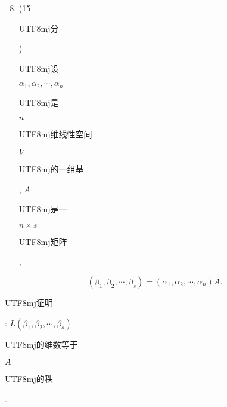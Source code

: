 \documentclass[10pt]{article}
\begin{document}
\begin{enumerate}
  \setcounter{enumi}{7}
  \item (15 \begin{CJK}{UTF8}{mj}分\end{CJK}) \begin{CJK}{UTF8}{mj}设\end{CJK} $\alpha_{1}, \alpha_{2}, \cdots, \alpha_{n}$ \begin{CJK}{UTF8}{mj}是\end{CJK} $n$ \begin{CJK}{UTF8}{mj}维线性空间\end{CJK} $V$ \begin{CJK}{UTF8}{mj}的一组基\end{CJK}, $A$ \begin{CJK}{UTF8}{mj}是一\end{CJK} $n \times s$ \begin{CJK}{UTF8}{mj}矩阵\end{CJK},
\end{enumerate}
$$
\left(\beta_{1}, \beta_{2}, \cdots, \beta_{s}\right)=\left(\alpha_{1}, \alpha_{2}, \cdots, \alpha_{n}\right) A .
$$
\begin{CJK}{UTF8}{mj}证明\end{CJK}: $L\left(\beta_{1}, \beta_{2}, \cdots, \beta_{s}\right)$ \begin{CJK}{UTF8}{mj}的维数等于\end{CJK} $A$ \begin{CJK}{UTF8}{mj}的秩\end{CJK}.
\end{document}
